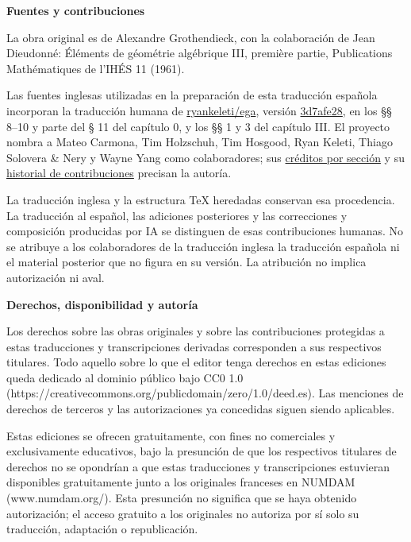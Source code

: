 \documentclass[oneside]{amsart}
\begin{document}
\begingroup
\small

\noindent\textbf{Fuentes y contribuciones}

La obra original es de Alexandre Grothendieck, con la colaboración de Jean Dieudonné: Éléments de géométrie algébrique III, première partie, Publications Mathématiques de l’IHÉS 11 (1961).

Las fuentes inglesas utilizadas en la preparación de esta traducción española incorporan la traducción humana de \href{https://github.com/ryankeleti/ega}{ryankeleti/ega}, versión \href{https://github.com/ryankeleti/ega/tree/3d7afe28c99d1887ccdb85acf2ca1afd93fb1971}{3d7afe28}, en los §§ 8–10 y parte del § 11 del capítulo 0, y los §§ 1 y 3 del capítulo III. El proyecto nombra a Mateo Carmona, Tim Holzschuh, Tim Hosgood, Ryan Keleti, Thiago Solovera \& Nery y Wayne Yang como colaboradores; sus \href{https://github.com/ryankeleti/ega/blob/3d7afe28c99d1887ccdb85acf2ca1afd93fb1971/README.md}{créditos por sección} y su \href{https://github.com/ryankeleti/ega/commits/3d7afe28c99d1887ccdb85acf2ca1afd93fb1971}{historial de contribuciones} precisan la autoría.

La traducción inglesa y la estructura TeX heredadas conservan esa procedencia. La traducción al español, las adiciones posteriores y las correcciones y composición producidas por IA se distinguen de esas contribuciones humanas. No se atribuye a los colaboradores de la traducción inglesa la traducción española ni el material posterior que no figura en su versión. La atribución no implica autorización ni aval.

\par\medskip
\noindent\textbf{Derechos, disponibilidad y autoría}

Los derechos sobre las obras originales y sobre las contribuciones protegidas a estas traducciones y transcripciones derivadas corresponden a sus respectivos titulares. Todo aquello sobre lo que el editor tenga derechos en estas ediciones queda dedicado al dominio público bajo CC0 1.0 (https://creativecommons.org/publicdomain/zero/1.0/deed.es). Las menciones de derechos de terceros y las autorizaciones ya concedidas siguen siendo aplicables.

Estas ediciones se ofrecen gratuitamente, con fines no comerciales y exclusivamente educativos, bajo la presunción de que los respectivos titulares de derechos no se opondrían a que estas traducciones y transcripciones estuvieran disponibles gratuitamente junto a los originales franceses en NUMDAM (www.numdam.org/). Esta presunción no significa que se haya obtenido autorización; el acceso gratuito a los originales no autoriza por sí solo su traducción, adaptación o republicación.
\end{document}
